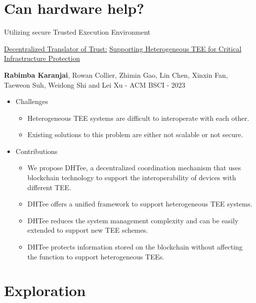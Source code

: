 \documentclass[10pt,aspectratio=169]{beamer}
\begin{document}
\section{Can hardware help?}

\begin{frame}[fragile]{Utilizing secure Trusted Execution Environment}

\href{https://camps.aptaracorp.com/ACM_PMS/PMS/ACM/BSCI23/14/7b4e9185-e3b1-11ed-b37c-16bb50361d1f/OUT/bsci23-14.html}{\underline{Decentralized Translator of Trust:}} \underline{Supporting Heterogeneous TEE for Critical Infrastructure Protection}

{\textbf{Rabimba Karanjai}, Rowan Collier, Zhimin Gao, Lin Chen, Xinxin Fan, Taeweon Suh, Weidong Shi and Lei Xu} - {ACM BSCI} - {2023}

\begin{itemize}
\item Challenges
  \begin{itemize}
    \item Heterogeneous TEE systems are difficult to interoperate with each other.
    \item Existing solutions to this problem are either not scalable or not secure.
  \end{itemize}
\item Contributions
  \begin{itemize}
    \item We propose DHTee, a decentralized coordination mechanism that uses blockchain technology to support the interoperability of devices with different TEE.
    \item DHTee offers a unified framework to support heterogeneous TEE systems.
    \item DHTee reduces the system management complexity and can be easily extended to support new TEE schemes.
    \item DHTee protects information stored on the blockchain without affecting the function to support heterogeneous TEEs.
  \end{itemize}
\end{itemize}

\end{frame}

\section{Exploration}
\end{document}
